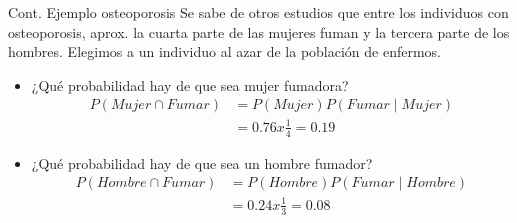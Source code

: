 \documentclass[11pt]{beamer}
\begin{document}
\begin{frame}{Cont. Ejemplo osteoporosis}
Se sabe de otros estudios que entre los individuos con osteoporosis, aprox. la cuarta parte de las mujeres fuman y la tercera parte de los hombres. Elegimos a un individuo al azar de la población de enfermos.
\begin{itemize}
\item ¿Qué probabilidad hay de que sea mujer fumadora?
\begin{equation*}
\begin{split}
P(Mujer \cap Fumar) & = P(Mujer) P(Fumar \mid Mujer) \\
& =  0.76 x \frac{1}{4} = 0.19
\end{split}
\end{equation*}
\item ¿Qué probabilidad hay de que sea un hombre fumador?
\begin{equation*}
\begin{split}
P(Hombre \cap Fumar) & = P(Hombre) P(Fumar \mid Hombre)\\
& = 0.24 x \frac{1}{3} = 0.08
\end{split}
\end{equation*}
\end{itemize}

\end{frame}
\end{document}
